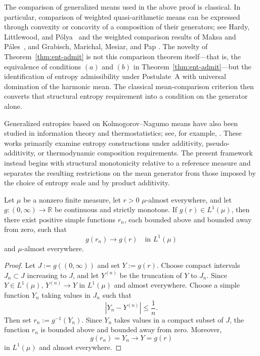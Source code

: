 \documentclass[reqno]{amsart}
\begin{document}
The comparison of generalized means used in the above proof is classical. In
particular, comparison of weighted quasi-arithmetic means can be expressed
through convexity or concavity of a composition of their generators; see Hardy, Littlewood, and P\'olya~\cite{HarLitPol52} and the weighted comparison results of Maksa and P\'ales~\cite{MaksaPales2010}, and Grabisch, Marichal, Mesiar, and Pap \cite{GrabischEtAl11}. The novelty of Theorem~\ref{thm:ent-admit} is not this comparison theorem itself---that is, the equivalence of conditions $(a)$ and $(b)$ in Theorem~\ref{thm:ent-admit}---but the identification of entropy admissibility under Postulate~A with universal domination of the harmonic mean. The classical mean-comparison criterion then converts that structural entropy requirement into a condition on the generator alone.

Generalized entropies based on Kolmogorov--Nagumo means have also been
studied in information theory and thermostatistics; see, for example,
\cite{AczelDaroczy75,CzaNau02,Duk10}. These works primarily examine entropy
constructions under additivity, pseudo-additivity, or thermodynamic
composition requirements. The present framework instead begins with
structural monotonicity relative to a reference measure and separates the
resulting restrictions on the mean generator from those imposed by the
choice of entropy scale and by product additivity.

\begin{lem}
Let $\mu$ be a nonzero finite measure, let $r>0$ $\mu$-almost
everywhere, and let $g:(0,\infty)\rightarrow \mathbb{R}$ be continuous and strictly
monotone. If $g(r)\in L^1(\mu)$, then there exist positive simple functions $r_n$, each bounded above
and bounded away from zero, such that
$$
g(r_n)\longrightarrow g(r)
\quad\text{in }L^1(\mu)
$$
and $\mu$-almost everywhere.
\end{lem}

\begin{proof}
Let $J:=g((0,\infty))$ and set $Y:=g(r)$. Choose compact intervals
$J_n\subset J$ increasing to $J$, and let $Y^{(n)}$ be the truncation of
$Y$ to $J_n$. Since $Y\in L^1(\mu)$, $Y^{(n)}\rightarrow Y$
in $L^1(\mu)$ and almost everywhere. Choose a simple function $Y_n$
taking values in $J_n$ such that
$$
|Y_n-Y^{(n)}|\leq\frac{1}{n}.
$$
Then set $r_n:=g^{-1}(Y_n)$.
Since $Y_n$ takes values in a compact subset of $J$, the function
$r_n$ is bounded above and bounded away from zero. Moreover,
$$
g(r_n)=Y_n\longrightarrow Y=g(r)
$$
in $L^1(\mu)$ and almost everywhere.
\end{proof}
\end{document}
